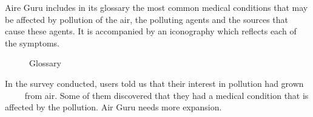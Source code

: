 Aire Guru includes in its glossary the most common medical conditions that may be affected by pollution
of the air, the polluting agents and the sources that cause these agents. It is accompanied by an iconography
which reflects each of the symptoms. \\

\begin{figure}[ht]
    \centering
    \hfill
  
  \caption{Glossary}
    \end{figure}
\begin{itemize}
    \done In the survey conducted, users told us that their interest in pollution had grown
         from air. Some of them discovered that they had a medical condition that is affected by the pollution.
    \crossed Air Guru needs more expansion.
    
\end{itemize}
\newpage